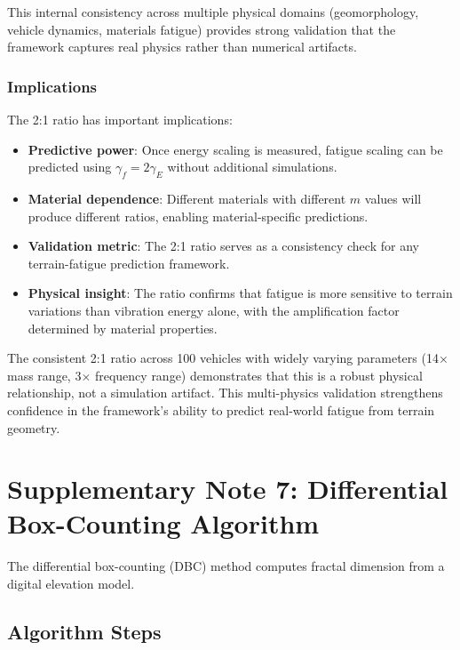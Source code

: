 \documentclass[11pt]{article}
\begin{document}
This internal consistency across multiple physical domains (geomorphology, vehicle dynamics, materials fatigue) provides strong validation that the framework captures real physics rather than numerical artifacts.

\subsubsection{Implications}

The 2:1 ratio has important implications:

\begin{itemize}
\item \textbf{Predictive power}: Once energy scaling is measured, fatigue scaling can be predicted using $\gamma_f = 2\gamma_E$ without additional simulations.

\item \textbf{Material dependence}: Different materials with different $m$ values will produce different ratios, enabling material-specific predictions.

\item \textbf{Validation metric}: The 2:1 ratio serves as a consistency check for any terrain-fatigue prediction framework.

\item \textbf{Physical insight}: The ratio confirms that fatigue is more sensitive to terrain variations than vibration energy alone, with the amplification factor determined by material properties.
\end{itemize}

The consistent 2:1 ratio across 100 vehicles with widely varying parameters (14× mass range, 3× frequency range) demonstrates that this is a robust physical relationship, not a simulation artifact. This multi-physics validation strengthens confidence in the framework's ability to predict real-world fatigue from terrain geometry.


\section{Supplementary Note 7: Differential Box-Counting Algorithm}

The differential box-counting (DBC) method computes fractal dimension from a digital elevation model.

\subsection{Algorithm Steps}
\end{document}
